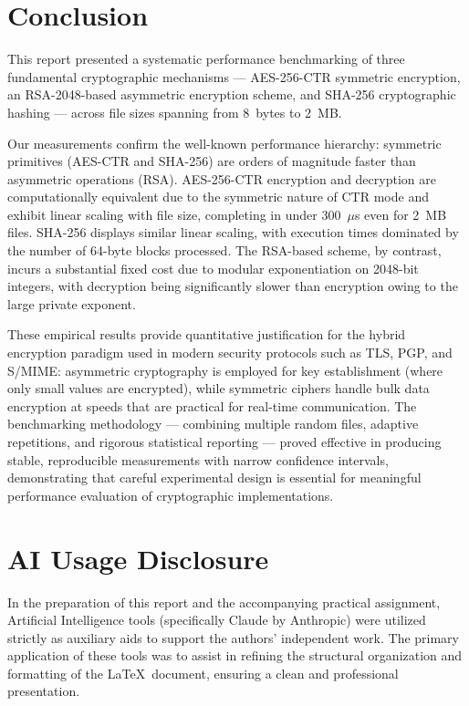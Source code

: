 \documentclass[10pt,a4paper]{article}
\begin{document}
\section{Conclusion}
\label{sec:conclusion}

This report presented a systematic performance benchmarking of three fundamental cryptographic mechanisms --- AES-256-CTR symmetric encryption, an RSA-2048-based asymmetric encryption scheme, and SHA-256 cryptographic hashing --- across file sizes spanning from 8~bytes to 2~MB.

Our measurements confirm the well-known performance hierarchy: symmetric primitives (AES-CTR and SHA-256) are orders of magnitude faster than asymmetric operations (RSA). AES-256-CTR encryption and decryption are computationally equivalent due to the symmetric nature of CTR mode and exhibit linear scaling with file size, completing in under 300~$\mu$s even for 2~MB files. SHA-256 displays similar linear scaling, with execution times dominated by the number of 64-byte blocks processed. The RSA-based scheme, by contrast, incurs a substantial fixed cost due to modular exponentiation on 2048-bit integers, with decryption being significantly slower than encryption owing to the large private exponent.

These empirical results provide quantitative justification for the hybrid encryption paradigm used in modern security protocols such as TLS, PGP, and S/MIME: asymmetric cryptography is employed for key establishment (where only small values are encrypted), while symmetric ciphers handle bulk data encryption at speeds that are practical for real-time communication. The benchmarking methodology --- combining multiple random files, adaptive repetitions, and rigorous statistical reporting --- proved effective in producing stable, reproducible measurements with narrow confidence intervals, demonstrating that careful experimental design is essential for meaningful performance evaluation of cryptographic implementations.

\section*{AI Usage Disclosure}

In the preparation of this report and the accompanying practical assignment, Artificial Intelligence tools (specifically Claude by Anthropic) were utilized strictly as auxiliary aids to support the authors' independent work. The primary application of these tools was to assist in refining the structural organization and formatting of the \LaTeX\ document, ensuring a clean and professional presentation.
\end{document}
